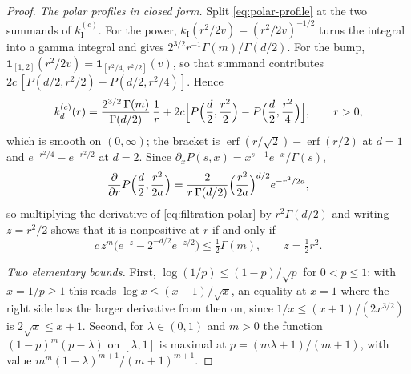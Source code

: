 \begin{proof}
\emph{The polar profiles in closed form.} Split \ref{eq:polar-profile} at the two summands of
$k^{(c)}_{\mathrm I}$. For the power, $k_{\mathrm I}(r^2/2v) = (r^2/2v)^{-1/2}$ turns the integral
into a gamma integral and gives $2^{3/2}r^{-1}\Gamma(m)/\Gamma(d/2)$. For the bump,
$\mathbf{1}_{[1,2]}(r^2/2v) = \mathbf{1}_{[r^2/4,\,r^2/2]}(v)$, so that summand contributes
$2c\,[P(d/2, r^2/2) - P(d/2, r^2/4)]$. Hence
\begin{equation}\label{eq:filtration-polar}
  k^{(c)}_d(r) = \frac{2^{3/2}\,\Gamma(m)}{\Gamma(d/2)}\,\frac1r
   + 2c\Bigl[P\Bigl(\frac d2,\frac{r^2}2\Bigr) - P\Bigl(\frac d2,\frac{r^2}4\Bigr)\Bigr],
   \qquad r > 0 ,
\end{equation}
which is smooth on $(0,\infty)$; the bracket is
$\operatorname{erf}(r/\sqrt2) - \operatorname{erf}(r/2)$ at $d = 1$ and $e^{-r^2/4} - e^{-r^2/2}$
at $d = 2$. Since $\partial_x P(s,x) = x^{s-1}e^{-x}/\Gamma(s)$,
\[
  \frac{\partial}{\partial r}P\Bigl(\frac d2, \frac{r^2}{2a}\Bigr)
   = \frac{2}{r\,\Gamma(d/2)}\Bigl(\frac{r^2}{2a}\Bigr)^{d/2}e^{-r^2/2a} ,
\]
so multiplying the derivative of \ref{eq:filtration-polar} by $r^2\Gamma(d/2)$ and writing
$z = r^2/2$ shows that it is nonpositive at $r$ if and only if
\begin{equation}\label{eq:filtration-criterion}
  c\,z^m\bigl(e^{-z} - 2^{-d/2}e^{-z/2}\bigr) \le \tfrac12\Gamma(m), \qquad z = \tfrac12 r^2 .
\end{equation}

\emph{Two elementary bounds.} First, $\log(1/p) \le (1-p)/\sqrt p$ for $0 < p \le 1$: with
$x = 1/p \ge 1$ this reads $\log x \le (x-1)/\sqrt x$, an equality at $x = 1$ where the right side
has the larger derivative from then on, since $1/x \le (x+1)/(2x^{3/2})$ is
$2\sqrt x \le x + 1$. Second, for $\lambda \in (0,1)$ and $m > 0$ the function
$(1-p)^m(p-\lambda)$ on $[\lambda,1]$ is maximal at $p = (m\lambda+1)/(m+1)$, with value
$m^m(1-\lambda)^{m+1}/(m+1)^{m+1}$.


\end{proof}
